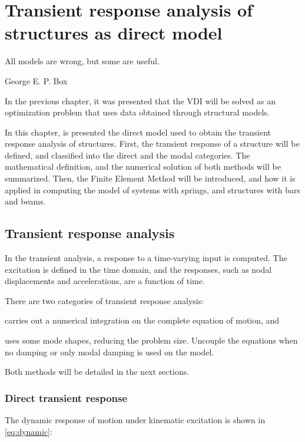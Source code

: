 \chapter{Transient response analysis of structures as direct model}
\label{chp:4}
\epigraph{All models are wrong, but some are useful.}{George E. P. Box}

In the previous chapter, it was presented that the VDI will be solved as an optimization problem that uses data obtained through structural models.

In this chapter, is presented the direct model used to obtain the transient response analysis of structures. First, the transient response of a structure will be defined, and classified into the direct and the modal categories. The mathematical definition, and the numerical solution of both methods will be summarized. Then, the Finite Element Method will be introduced, and how it is applied in computing the model of systems with springs, and structures with bars and beams.

\section{Transient response analysis}

In the transient analysis, a response to a time-varying input is computed. The excitation is defined in the time domain, and the responses, such as nodal displacements and accelerations, are a function of time.

There are two categories of transient response analysis:

\begin{description}[style=sameline]
    \item [Direct transient response] carries out a numerical integration on the complete equation of motion, and
    \item[Modal transient response] uses some mode shapes, reducing the problem size. Uncouple the equations when no damping or only modal damping is used on the model.
\end{description}

Both methods will be detailed in the next sections.

\subsection{Direct transient response}
\label{sec:str}

The dynamic response of motion under kinematic excitation is shown in \autoref{eq:dynamic}:

